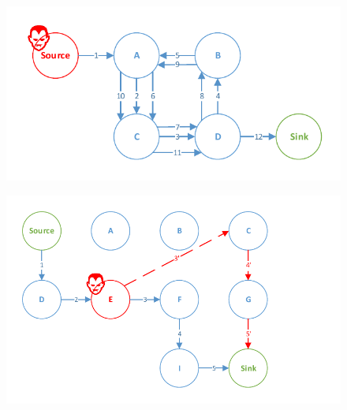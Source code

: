 \documentclass{llncs}
\begin{document}
\begin{figure}
\centering
\begin{minipage}{.55\linewidth}
  \centering
  \includegraphics[width=1\linewidth]{figures/Carousel_Attack.pdf}
  \label{fig:carousel_attack}
\end{minipage}%
\begin{minipage}{.55\linewidth}
  \centering
  \includegraphics[width=1\linewidth]{figures/Directional_Antenna_Attack.pdf}
  \label{fig:directional_antenna_attack}
\end{minipage}
\end{figure}
\end{document}
